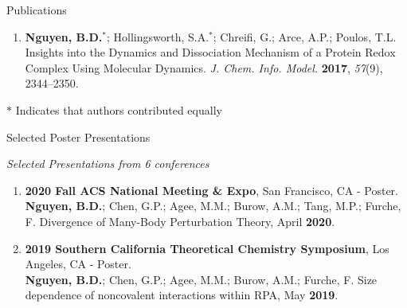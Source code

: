 \documentclass{resume} %
\begin{document}
\begin{rSection}{Publications}
\begin{enumerate}
\item \textbf{Nguyen, B.D.}$^*$; Hollingsworth, S.A.$^*$; Chreifi, G.;
  Arce, A.P.; Poulos, T.L. Insights into the Dynamics and Dissociation Mechanism
  of a Protein Redox Complex Using Molecular Dynamics. \textit{J. Chem. Info. Model.}
  \textbf{2017}, \textit{57}(9), 2344--2350.

%
%
  
\end{enumerate}

$*$ Indicates that authors contributed equally

\end{rSection}

\begin{rSection}{Selected Poster Presentations}

\textit{Selected Presentations from 6 conferences}

  \begin{enumerate}

  \item \textbf{2020 Fall ACS National Meeting \& Expo}, San Francisco, CA - Poster. \\
  \textbf{Nguyen, B.D.}; Chen, G.P.; Agee, M.M.; Burow, A.M.; Tang, M.P.;
  Furche, F. Divergence of Many-Body Perturbation Theory, April \textbf{2020}.
  
  \item \textbf{2019 Southern California Theoretical Chemistry Symposium}, Los Angeles, CA - Poster. \\
  \textbf{Nguyen, B.D.}; Chen, G.P.; Agee, M.M.; Burow, A.M.; Furche, F.  
  Size dependence of noncovalent interactions within RPA, May \textbf{2019}.
  \end{enumerate}
  
\end{rSection}
\end{document}
